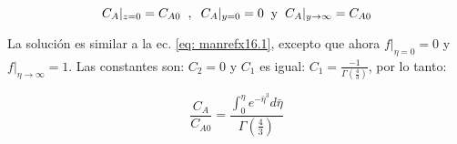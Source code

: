 \begin{equation}
C_A|_{z=0} = C_{A0} \hspace{0.2cm} , \hspace{0.2cm} C_A|_{y=0} = 0 \hspace{0.2cm} \text{y} \hspace{0.2cm} C_A|_{y \to \infty} = C_{A0}
\end{equation}

La solución es similar a la ec. \eqref{eq: manrefx16.1}, excepto que ahora $f|_{\eta = 0} = 0$ y \\ $f|_{\eta \to \infty} = 1$. Las constantes son: $C_2 = 0$ y $C_1$ es igual: $C_1 = \frac{-1}{\Gamma (\frac{4}{3})}$, por lo tanto:

\begin{equation}
	\frac{C_A}{C_{A0}} = \frac{\int_0^\eta e^{- \bar{\eta}^3} d \bar{\eta}}{\Gamma (\frac{4}{3})}
\end{equation}
